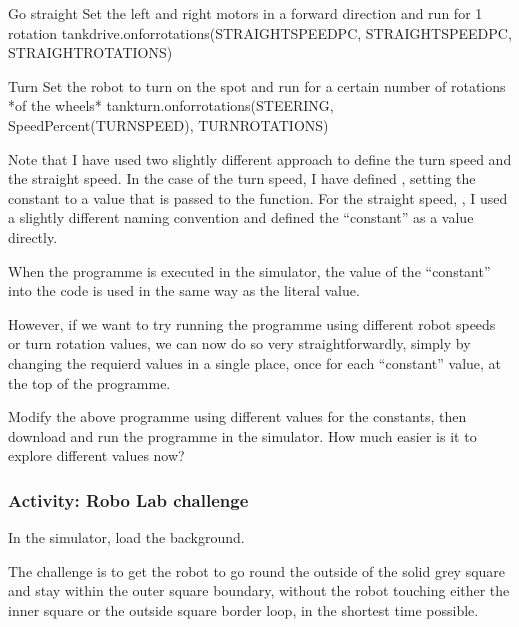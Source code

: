 \documentclass[letterpaper,10pt,english]{sphinxmanual}
\begin{document}
{\begin{sphinxVerbatim}[commandchars=\\\{\}]
\PYGZsh{}Go straight
\PYGZsh{} Set the left and right motors in a forward direction
\PYGZsh{} and run for 1 rotation
tank\PYGZus{}drive.on\PYGZus{}for\PYGZus{}rotations(STRAIGHT\PYGZus{}SPEED\PYGZus{}PC, STRAIGHT\PYGZus{}SPEED\PYGZus{}PC, STRAIGHT\PYGZus{}ROTATIONS)

\PYGZsh{}Turn
\PYGZsh{} Set the robot to turn on the spot
\PYGZsh{} and run for a certain number of rotations *of the wheels*
tank\PYGZus{}turn.on\PYGZus{}for\PYGZus{}rotations(STEERING, SpeedPercent(TURN\PYGZus{}SPEED), TURN\PYGZus{}ROTATIONS)
\end{sphinxVerbatim}
}

Note that I have used two slightly different approach to define the turn speed and the straight speed. In the case of the turn speed, I have defined , setting the constant to a value that is passed to the  function. For the straight speed, , I used a slightly different naming convention and defined the “constant” as a  value directly.

When the programme is executed in the simulator, the value of the “constant” into the code is used in the same way as the literal value.

However, if we want to try running the programme using different robot speeds or turn rotation values, we can now do so very straightforwardly, simply by changing the requierd values in a single place, once for each “constant” value, at the top of the programme.

Modify the above programme using different values for the constants, then download and run the programme in the simulator. How much easier is it to explore different values now?


\subsubsection{Activity: Robo Lab challenge}
\label{\detokenize{content/01_Robot_Lab/Section_00_02:Activity:-Robo-Lab-challenge}}
In the simulator, load the  background.

The challenge is to get the robot to go round the outside of the solid grey square and stay within the outer square boundary, without the robot touching either the inner square or the outside square border loop, in the shortest time possible.
\end{document}
